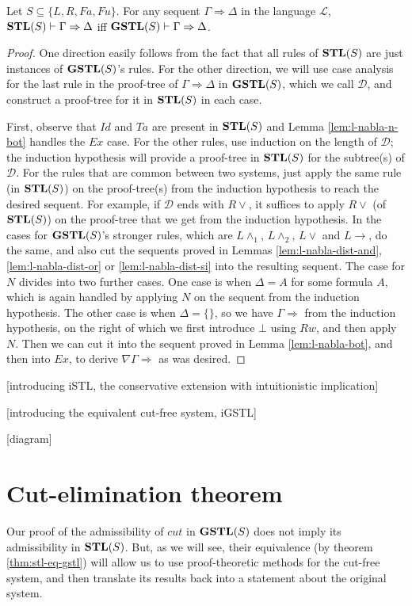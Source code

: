 \documentclass[12pt,a4paper]{article}
\begin{document}
\begin{thm}\label{thm:stl-eq-gstl}
	Let $S \subseteq \{L, R, Fa, Fu\}$. For any sequent $\Gamma \Rightarrow \Delta$ in the language $\mathcal{L}$, $\mathbf{STL}(S) \vdash \Gamma \Rightarrow \Delta$ iff $\mathbf{GSTL}(S) \vdash \Gamma \Rightarrow \Delta$.
\end{thm}
\begin{proof}
	One direction easily follows from the fact that all rules of $\mathbf{STL}(S)$ are just instances of $\mathbf{GSTL}(S)$'s rules.
	For the other direction, we will use case analysis for the last rule in the proof-tree of $\Gamma \Rightarrow \Delta$ in $\mathbf{GSTL}(S)$, which we call $\mathcal{D}$, and construct a proof-tree for it in $\mathbf{STL}(S)$ in each case.
	
	First, observe that $Id$ and $Ta$ are present in $\mathbf{STL}(S)$ and Lemma \ref{lem:l-nabla-n-bot} handles the $Ex$ case.
	For the other rules, use induction on the length of $\mathcal{D}$; the induction hypothesis will provide a proof-tree in $\mathbf{STL}(S)$ for the subtree(s) of $\mathcal{D}$.
	For the rules that are common between two systems, just apply the same rule (in $\mathbf{STL}(S)$) on the proof-tree(s) from the induction hypothesis to reach the desired sequent. For example, if $\mathcal{D}$ ends with $R \vee$, it suffices to apply $R \vee$ (of $\mathbf{STL}(S)$) on the proof-tree that we get from the induction hypothesis.
	In the cases for $\mathbf{GSTL}(S)$'s stronger rules, which are $L \wedge_1$, $L \wedge_2$, $L \vee$ and $L \rightarrow$, do the same, and also cut the sequents proved in Lemmas \ref{lem:l-nabla-dist-and}, \ref{lem:l-nabla-dist-or} or \ref{lem:l-nabla-dist-si} into the resulting sequent.
	The case for $N$ divides into two further cases. One case is when $\Delta = A$ for some formula $A$, which is again handled by applying $N$ on the sequent from the induction hypothesis.
	The other case is when $\Delta = \{\}$, so we have $\Gamma \Rightarrow$ from the induction hypothesis, on the right of which we first introduce $\bot$ using $Rw$, and then apply $N$.
	Then we can cut it into the sequent proved in Lemma \ref{lem:l-nabla-bot}, and then into $Ex$, to derive $\nabla \Gamma \Rightarrow$ as was desired.
\end{proof}

[introducing iSTL, the conservative extension with intuitionistic implication]

[introducing the equivalent cut-free system, iGSTL]

[diagram]

\section{Cut-elimination theorem}
Our proof of the admissibility of $cut$ in $\mathbf{GSTL}(S)$ does not imply its admissibility in $\mathbf{STL}(S)$. But, as we will see, their equivalence (by theorem \ref{thm:stl-eq-gstl}) will allow us to use proof-theoretic methods for the cut-free system, and then translate its results back into a statement about the original system.
\end{document}
